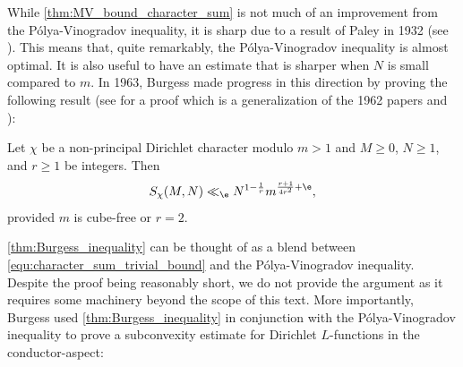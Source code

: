     While \cref{thm:MV_bound_character_sum} is not much of an improvement from the P\'olya-Vinogradov inequality, it is sharp due to a result of Paley in 1932 (see \cite{paley1932theorem}). This means that, quite remarkably, the P\'olya-Vinogradov inequality is almost optimal. It is also useful to have an estimate that is sharper when \(N\) is small compared to \(m\). In 1963, Burgess made progress in this direction by proving the following result (see \cite{burgess1963character} for a proof which is a generalization of the 1962 papers \cite{burgess1962characterL-series} and \cite{burgess1962characterprimitive}):

    \begin{theorem}\label{thm:Burgess_inequality}
      Let \(\chi\) be a non-principal Dirichlet character modulo \(m > 1\) and \(M \ge 0\), \(N \ge 1\), and \(r \ge 1\) be integers. Then
      \[
        S_{\chi}(M,N) \ll_{\e} N^{1-\frac{1}{r}}m^{\frac{r+1}{4r^{2}}+\e},
      \]
      provided \(m\) is cube-free or \(r = 2\).
    \end{theorem}

    \cref{thm:Burgess_inequality} can be thought of as a blend between \cref{equ:character_sum_trivial_bound} and the P\'olya-Vinogradov inequality. Despite the proof being reasonably short, we do not provide the argument as it requires some machinery beyond the scope of this text. More importantly, Burgess used \cref{thm:Burgess_inequality} in conjunction with the P\'olya-Vinogradov inequality to prove a subconvexity estimate for Dirichlet \(L\)-functions in the conductor-aspect:

